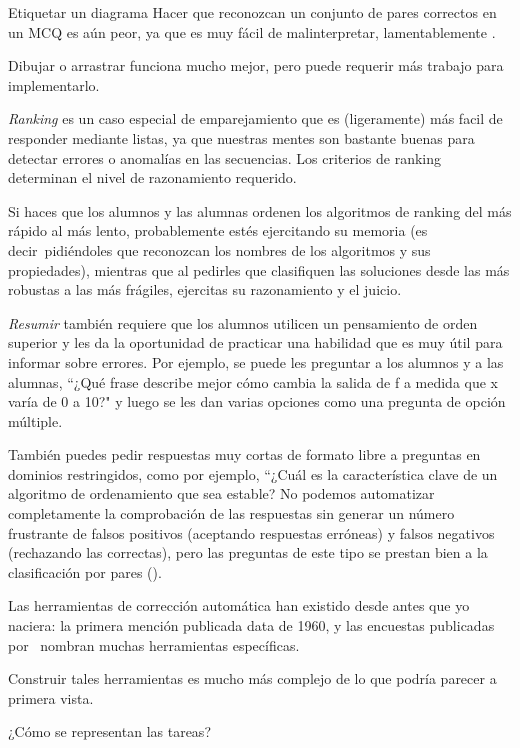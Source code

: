 \begin{aside}{Etiquetar un diagrama}
Hacer que reconozcan un conjunto de pares correctos en un MCQ es aún peor, 
ya que es muy fácil de malinterpretar, lamentablemente .

Dibujar o arrastrar funciona mucho mejor, 
pero puede requerir más trabajo para implementarlo.


\emph{Ranking} es un caso especial de emparejamiento 
que es (ligeramente) más facil de responder mediante listas, 
ya que nuestras mentes son bastante buenas para detectar errores o anomalías en las secuencias.
Los criterios de ranking determinan el nivel de razonamiento requerido.

Si haces que los alumnos y las alumnas ordenen los algoritmos de ranking del más rápido al más lento, probablemente estés ejercitando su memoria 
(es decir\  pidiéndoles que reconozcan los nombres de los algoritmos y sus propiedades), mientras que al pedirles que clasifiquen las soluciones desde las más robustas a las más frágiles, ejercitas su razonamiento y el juicio.

\emph{Resumir} también requiere que los alumnos utilicen un pensamiento de orden superior y les da la oportunidad de practicar una habilidad que es muy útil para informar sobre errores.
Por ejemplo, 
se puede les preguntar a los alumnos y a las alumnas,
 ``¿Qué frase describe mejor cómo cambia la salida de f a medida que  x varía de 0 a 10?" 
y luego se les dan varias opciones como una pregunta de opción múltiple.

También puedes pedir respuestas muy cortas de formato libre a preguntas en dominios restringidos, como por ejemplo, ``¿Cuál es la característica clave de un algoritmo de ordenamiento que sea estable?
No podemos automatizar completamente la comprobación de las respuestas sin generar un número frustrante de falsos positivos 
(aceptando respuestas erróneas) 
y falsos negativos (rechazando las correctas), 
pero las preguntas de este tipo se prestan bien a la clasificación por pares 
().


Las herramientas de corrección automática han existido desde antes que yo naciera: la primera mención publicada data de 1960, y las encuestas publicadas por~\cite{Douc2005,Ihan2010} nombran muchas herramientas específicas.

Construir tales herramientas es mucho más complejo de lo que podría parecer a primera vista.

¿Cómo se representan las tareas?


\end{aside}

